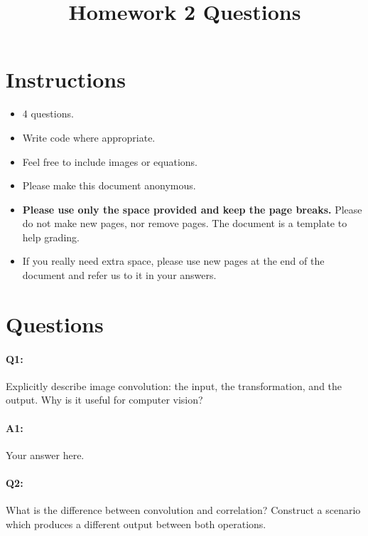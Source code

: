 \title{\vspace{-1cm}Homework 2 Questions}



	\maketitle
	\vspace{-3cm}
	\thispagestyle{fancy}
	
	\section*{Instructions}
	\begin{itemize}
		\item 4 questions.
		\item Write code where appropriate.
		\item Feel free to include images or equations.
		\item Please make this document anonymous.
		\item \textbf{Please use only the space provided and keep the page breaks.} Please do not make new pages, nor remove pages. The document is a template to help grading.
		\item If you really need extra space, please use new pages at the end of the document and refer us to it in your answers.
	\end{itemize}

	\section*{Questions}
	
	\paragraph{Q1:} Explicitly describe image convolution: the input, the transformation, and the output. Why is it useful for computer vision?
	
	\paragraph{A1:} Your answer here.
	
	
	
	
	\pagebreak
	\paragraph{Q2:} What is the difference between convolution and correlation? Construct a scenario which produces a different output between both operations.
	
